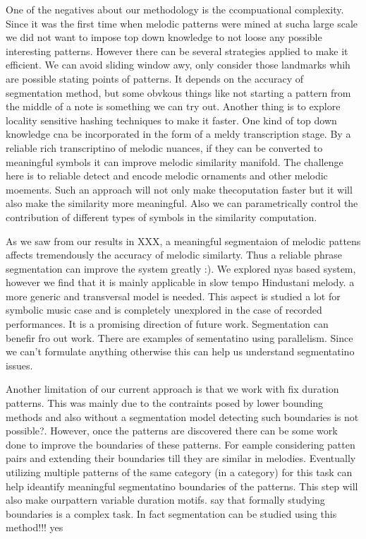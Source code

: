 One of the negatives about our methodology is the ccompuational complexity. Since it was the first time when melodic patterns were mined at sucha large scale we did not want to impose top down knowledge to not loose any possible interesting patterns. However there can be several strategies applied to make it efficient. We can avoid sliding window awy, only consider those landmarks whih are possible stating points of patterns. It depends on the accuracy of segmentation method, but some obvkous things like not starting a pattern from the middle of a note is something we can try out. Another thing is to explore locality sensitive hashing techniques to make it faster. One kind of top down knowledge cna be incorporated in the form of a meldy transcription stage. By a reliable rich transcriptino of melodic nuances, if they can be converted to meaningful symbols it can improve melodic similarity manifold. The challenge here is to reliable detect and encode melodic ornaments and other melodic moements. Such an approach will not only make thecoputation faster but it will also make the similarity more meaningful. Also we can parametrically control the contribution of different types of symbols in the similarity computation. 

As we saw from our results in XXX, a meaningful segmentaion of melodic pattens affects tremendously the accuracy of melodic similarty. Thus a reliable phrase segmentation can improve the system greatly :). We explored nyas based system, however we find that it is mainly applicable in slow tempo Hindustani melody. a more generic and transversal model is needed. This aspect is studied a lot for symbolic music case and is completely unexplored in the case of recorded performances. It is a promising direction of future work. Segmentation can benefir fro out work. There are examples of sementatino using parallelism. Since we can't formulate anything otherwise this can help us understand segmentatino issues. 

Another limitation of our current approach is that we work with fix duration patterns. This was mainly due to the contraints posed by lower bounding methods and also without a segmentation model detecting such boundaries is not possible?. However, once the patterns are discovered there can be some work done to improve the boundaries of these patterns. For eample considering patten pairs and extending their boundaries till they are similar in melodies. Eventually utilizing multiple patterns of the same category (in a category) for this task can help ideantify meaningful segmentatino boundaries of the patterns. This step will also make ourpattern variable duration motifs. say that formally studying boundaries is a complex task. In fact segmentation can be studied using this method!!! yes

